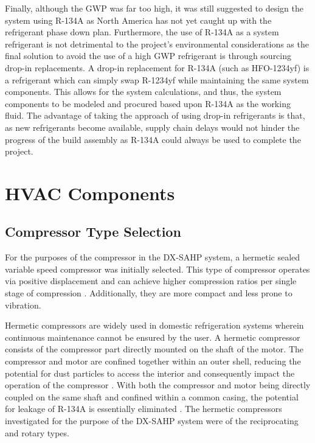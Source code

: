\medskip
Finally, although the GWP was far too high, it was still suggested to design the system using R-134A as North America has not yet caught up with the refrigerant phase down plan. Furthermore, the use of R-134A as a system refrigerant is not detrimental to the project’s environmental considerations as the final solution to avoid the use of a high GWP refrigerant is through sourcing drop-in replacements. A drop-in replacement for R-134A (such as HFO-1234yf) is a refrigerant which can simply swap R-1234yf while maintaining the same system components. This allows for the system calculations, and thus, the system components to be modeled and procured based upon R-134A as the working fluid. The advantage of taking the approach of using drop-in refrigerants is that, as new refrigerants become available, supply chain delays would not hinder the progress of the build assembly as R-134A could always be used to complete the project.

\section{HVAC Components}

\subsection{Compressor Type Selection}

For the purposes of the compressor in the DX-SAHP system, a hermetic sealed variable speed compressor was initially selected. This type of compressor operates via positive displacement and can achieve higher compression ratios per single stage of compression \cite{other_compressors}. Additionally, they are more compact and less prone to vibration.

\medskip
Hermetic compressors are widely used in domestic refrigeration systems wherein continuous maintenance cannot be ensured by the user. A hermetic compressor consists of the compressor part directly mounted on the shaft of the motor. The compressor and motor are confined together within an outer shell, reducing the potential for dust particles to access the interior and consequently impact the operation of the compressor \cite{hermetic_compressors}. With both the compressor and motor being directly coupled on the same shaft and confined within a common casing, the potential for leakage of R-134A is essentially eliminated \cite{what_hermetic_compressor}. The hermetic compressors investigated for the purpose of the DX-SAHP system were of the reciprocating and rotary types.

